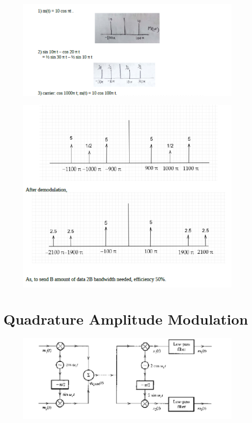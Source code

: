 \begin{figure}[H]
	\centering
	\includegraphics[]{Capture5.PNG}
\end{figure}

\begin{figure}[H]
	\centering
	\includegraphics[]{Capture6.PNG}
\end{figure}


\section{Quadrature Amplitude Modulation}

\begin{figure}[H]
	\centering
	\includegraphics[]{Capture7.PNG}
\end{figure}

